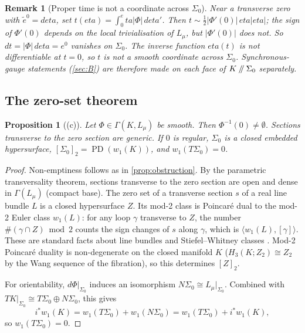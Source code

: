 \documentclass[11pt]{article}
\theoremstyle{canonmath}
\newtheorem{remark}[theorem]{Remark}
\theoremstyle{canonpostulate}
\theoremstyle{canonproposition}
\theoremstyle{canonmath}
\newtheorem{proposition*}[theorem]{Proposition}
\theoremstyle{canonproposition}
\providecommand{\cutK}{\Klein\mathbin{/\mkern-5mu/}\Sigma_0}
\providecommand{\Lmu}{\mathcal{L}_\mu}
\providecommand{\PD}{\operatorname{PD}}
\providecommand{\Klein}{\mathcal{K}}
\providecommand{\Ztwo}{\mathbb{Z}_2}
\def\mathbb#1{#1}%
\def\mathcal#1{#1}%
\def\eta{eta}%
\begin{document}
\begin{remark}[Proper time is not a coordinate across $\Sigma_0$]\label{rem:propertime}
Near a transverse zero with $\tilde{e}^0 = d\eta$, set $t(\eta) = \int_0^\eta|\Phi|\,d\eta'$. Then $t \sim \tfrac12|\Phi'(0)|\,\eta|\eta|$; the sign of $\Phi'(0)$ depends on the local trivialisation of $\Lmu$, but $|\Phi'(0)|$ does not. So $dt = |\Phi|\,d\eta = e^0$ vanishes on $\Sigma_0$. The inverse function $\eta(t)$ is not differentiable at $t = 0$, so $t$ is not a smooth coordinate across $\Sigma_0$. Synchronous-gauge statements (\cref{sec:B}) are therefore made on each face of $\cutK$ separately.
\end{remark}

\subsection{The zero-set theorem}

\begin{proposition*}[(c)]\label{prop:zeroset}
Let $\Phi \in \Gamma(\Klein,\Lmu)$ be smooth. Then $\Phi^{-1}(0) \neq\emptyset$. Sections transverse to the zero section are generic. If $0$ is regular, $\Sigma_0$ is a closed embedded hypersurface, $[\Sigma_0]_2 = \PD(w_1(\Klein))$, and $w_1(T\Sigma_0) = 0$.
\end{proposition*}

\begin{proof}
Non-emptiness follows as in \cref{prop:obstruction}. By the parametric transversality theorem, sections transverse to the zero section are open and dense in $\Gamma(\Lmu)$ (compact base). The zero set of a transverse section $s$ of a real line bundle $L$ is a closed hypersurface $Z$. Its mod-2 class is Poincaré dual to the mod-2 Euler class $w_1(L)$: for any loop $\gamma$ transverse to $Z$, the number $\#(\gamma\cap Z) \bmod 2$ counts the sign changes of $s$ along $\gamma$, which is $\langle w_1(L),[\gamma]\rangle$. These are standard facts about line bundles and Stiefel--Whitney classes \cite{MilnorStasheff,BottTu}. Mod-2 Poincaré duality is non-degenerate on the closed manifold $\Klein$ ($H_3(\Klein;\Ztwo)\cong\Ztwo$ by the Wang sequence of the fibration), so this determines $[Z]_2$.

For orientability, $d\Phi|_{\Sigma_0}$ induces an isomorphism $N\Sigma_0 \cong \Lmu|_{\Sigma_0}$. Combined with $T\Klein|_{\Sigma_0} \cong T\Sigma_0\oplus N\Sigma_0$, this gives
\[
i^*w_1(\Klein) = w_1(T\Sigma_0) + w_1(N\Sigma_0) = w_1(T\Sigma_0) + i^*w_1(\Klein),
\]
so $w_1(T\Sigma_0) = 0$.
\end{proof}
\end{document}

